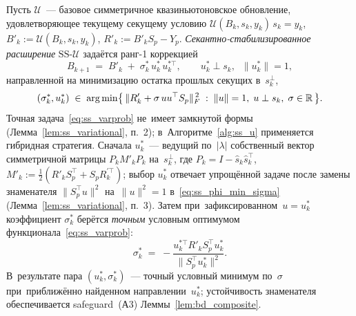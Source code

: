 \begin{definition}
\label{def:ss}
Пусть $\mathcal{U}$~--- базовое симметричное квазиньютоновское
обновление, удовлетворяющее текущему секущему условию
$\mathcal{U}(B_k, s_k, y_k)\, s_k = y_k$,
$B'_k:=\mathcal{U}(B_k,s_k,y_k)$, $R'_k:=B'_k S_p - Y_p$.
\emph{Секантно-стабилизированное расширение}
$\mathrm{SS}\text{-}\mathcal{U}$ задаётся ранг-1 коррекцией
\begin{equation}\label{eq:ss_update}
  B_{k+1} \;=\; B'_k \;+\; \sigma_k^*\, u_k^*\, u_k^{*\top},
  \qquad u_k^* \perp s_k,\;\; \|u_k^*\| = 1,
\end{equation}
направленной на минимизацию остатка прошлых секущих в~$s_k^\perp$,
\begin{equation}\label{eq:ss_varprob}
  (\sigma_k^*, u_k^*) \;\in\; \operatorname*{arg\,min}\bigl\{\,\|R'_k + \sigma\, u u^\top S_p\|_F^{\,2}
     \;:\; \|u\|=1,\; u\perp s_k,\; \sigma\in\mathbb{R}\,\bigr\}.
\end{equation}
Точная задача~\eqref{eq:ss_varprob} не~имеет замкнутой формы
(Лемма~\ref{lem:ss_variational}, п.~2); в~Алгоритме~\ref{alg:ss_u}
применяется гибридная стратегия. Сначала $u_k^*$~--- ведущий по~$|\lambda|$
собственный вектор симметричной матрицы $P_k M'_k P_k$ на~$s_k^\perp$,
где $P_k = I - \hat s_k\hat s_k^\top$, $M'_k:=\tfrac12(R'_k S_p^\top + S_p R_k^{\prime\top})$;
выбор $u_k^*$ отвечает упрощённой задаче после замены знаменателя
$\|S_p^\top u\|^2$ на~$\|u\|^2 = 1$ в~\eqref{eq:ss_phi_min_sigma}
(Лемма~\ref{lem:ss_variational}, п.~3). Затем при~зафиксированном~$u=u_k^*$
коэффициент $\sigma_k^*$ берётся \emph{точным} условным оптимумом
функционала~\eqref{eq:ss_varprob}:
\begin{equation}\label{eq:ss_sigma}
  \sigma_k^* \;=\; -\frac{u_k^{*\top} R'_k S_p^{\top} u_k^*}
                       {\|S_p^{\top} u_k^*\|^2}.
\end{equation}
В~результате пара $(u_k^*,\sigma_k^*)$~--- точный условный минимум
по~$\sigma$ при~приближённо найденном направлении~$u_k^*$;
устойчивость знаменателя обеспечивается safeguard~(А3)
Леммы~\ref{lem:bd_composite}.
\end{definition}

